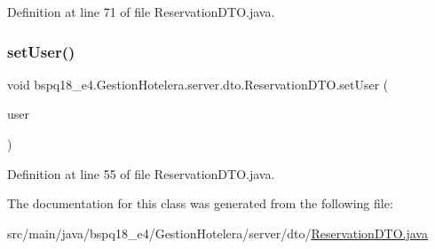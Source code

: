 Definition at line 71 of file Reservation\+D\+T\+O.\+java.

\mbox{\label{classbspq18__e4_1_1_gestion_hotelera_1_1server_1_1dto_1_1_reservation_d_t_o_a48432135cea148c025244ff0f5cd41b3}} 
\subsubsection{\texorpdfstring{set\+User()}{setUser()}}
{\footnotesize\ttfamily void bspq18\+\_\+e4.\+Gestion\+Hotelera.\+server.\+dto.\+Reservation\+D\+T\+O.\+set\+User (\begin{DoxyParamCaption}\item[{\mbox{\hyperlink{classbspq18__e4_1_1_gestion_hotelera_1_1server_1_1dto_1_1_user_d_t_o}{User\+D\+TO}}}]{user }\end{DoxyParamCaption})}



Definition at line 55 of file Reservation\+D\+T\+O.\+java.



The documentation for this class was generated from the following file\+:\begin{DoxyCompactItemize}
\item 
src/main/java/bspq18\+\_\+e4/\+Gestion\+Hotelera/server/dto/\mbox{\hyperlink{_reservation_d_t_o_8java}{Reservation\+D\+T\+O.\+java}}\end{DoxyCompactItemize}
